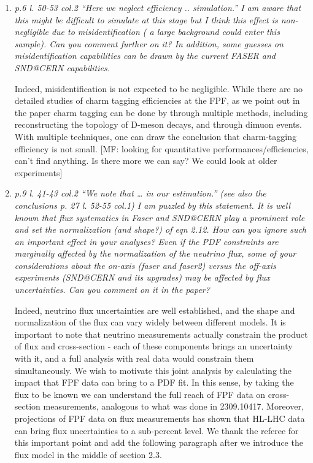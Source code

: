 \documentclass[11pt,a4paper]{article}
\begin{document}
\begin{enumerate}
\item{\it p.6 l. 50-53 col.2 “Here we neglect efficiency .. simulation.” I am aware that this might be difficult to simulate at this stage but I think this effect is non-negligible due to misidentification ( a large background could enter this sample). Can you comment further on it? In addition, some guesses on misidentification capabilities can be drawn by the current FASER and SND@CERN capabilities.}

Indeed, misidentification is not expected to be negligible. While there are no detailed studies of charm tagging efficiencies at the FPF, as we point out in the paper charm tagging can be done by through multiple methods, including reconstructing the topology of D-meson decays, and through dimuon events. With multiple techniques, one can draw the conclusion that charm-tagging efficiency is not small.
{\color {red} [MF: looking for quantitative performances/efficiencies, can't find anything. Is there more we can say? We could look at older experiments]}

\item{\it p.9 l. 41-43 col.2 “We note that … in our estimation.” (see also the conclusions p. 27 l. 52-55 col.1) I am puzzled by this statement. It is well known that flux systematics in Faser and SND@CERN play a prominent role and set the normalization (and shape?) of eqn 2.12. How can you ignore such an important effect in your analyses? Even if the PDF constraints are marginally affected by the normalization of the neutrino flux, some of your considerations about the on-axis (faser and faser2) versus the off-axis experiments (SND@CERN and its upgrades) may be affected by flux uncertainties. Can you comment on it in the paper?}

Indeed, neutrino flux uncertainties are well established, and the shape and normalization of the flux can vary widely between different models. It is important to note that neutrino measurements actually constrain the product of flux and cross-section - each of these components brings an uncertainty with it, and a full analysis with real data would constrain them simultaneously. We wish to motivate this joint analysis by calculating the  impact that FPF data can bring to a PDF fit. In this sense, by taking the flux to be known we can understand the full reach of FPF data on cross-section measurements, analogous to what was done in 2309.10417. Moreover, projections of FPF data on flux measurements has shown that HL-LHC data can bring flux uncertainties to a sub-percent level. We thank the referee for this important point and add the following paragraph after we introduce the flux model in the middle of section 2.3. 


\end{enumerate}
\end{document}
